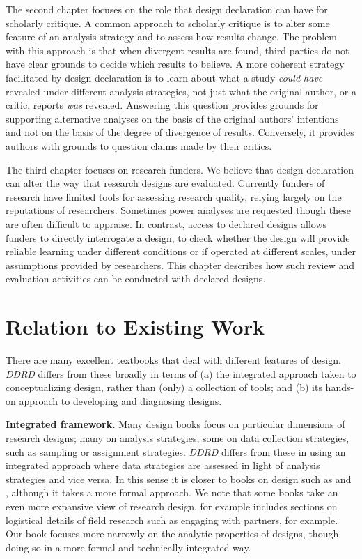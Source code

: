 \documentclass[11pt]{article}
\begin{document}
The second chapter focuses on the role that design declaration can have for scholarly critique. A common approach to scholarly critique is to alter some feature of an analysis strategy and to assess how results change. The problem with this approach is that when divergent results are found, third parties do not have clear grounds to decide which results to believe. A more coherent strategy facilitated by design declaration is to learn about what a study {\it could have} revealed under different analysis strategies, not just what the original author, or a critic, reports {\it was} revealed. Answering this question provides grounds for supporting alternative analyses on the basis of the original authors' intentions and not on the basis of the degree of divergence of results. Conversely, it provides authors with grounds to question claims made by their critics. 

The third chapter focuses on research funders. We believe that design declaration can alter the way that research designs are evaluated. Currently funders of research have limited tools for assessing  research quality, relying largely on the reputations of researchers. Sometimes power analyses are requested though these are often difficult to appraise. In contrast, access to declared designs allows funders to directly interrogate a design, to check whether the design will provide reliable learning under different conditions or if operated at different scales, under assumptions provided by researchers. This chapter describes how such review and evaluation activities can be conducted with declared designs.

\section{Relation to Existing Work}

There are many excellent textbooks that deal with different features of design. \textit{DDRD} differs from these broadly in terms of (a) the integrated approach taken to conceptualizing design, rather than (only) a collection of tools; and (b) its hands-on approach to developing and diagnosing designs.

\textbf{Integrated framework.} Many design books focus on particular dimensions of research designs; many on analysis strategies, some on data collection strategies, such as sampling or assignment strategies. \textit{DDRD} differs from these in using an integrated approach where data strategies are assessed in light of analysis strategies and vice versa. In this sense it is closer to books on design such as \citet{gerring2011social} and \citet{brady2010rethinking}, although it takes a more formal approach. We note that some books take an even more expansive view of research design. \citet{glennerster2013running} for example includes sections on logistical details of field research such as engaging with partners, for example. Our book focuses more narrowly on the analytic properties of designs, though doing so in a more formal and technically-integrated way. 
\end{document}
